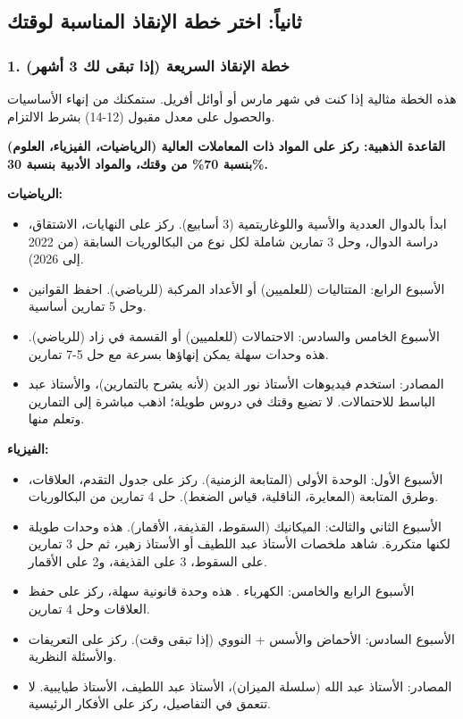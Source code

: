 \documentclass[12pt,a4paper]{book}
\newcommand{\importantAr}[1]{%
	\begin{important}
		\bfseries #1
	\end{important}
}
\begin{document}
	\subsection{ثانياً: اختر خطة الإنقاذ المناسبة لوقتك}
	
	\subsubsection*{1. خطة الإنقاذ السريعة (إذا تبقى لك 3 أشهر)}
	     \label{sec:psy-late-start-success3}
	هذه الخطة مثالية إذا كنت في شهر مارس أو أوائل أفريل. ستمكنك من إنهاء الأساسيات والحصول على معدل مقبول (12-14) بشرط الالتزام.
	
	\importantAr{القاعدة الذهبية: ركز على المواد ذات المعاملات العالية (الرياضيات، الفيزياء، العلوم) بنسبة 70\% من وقتك، والمواد الأدبية بنسبة 30\%.}
	
	\textbf{الرياضيات:}
	\begin{itemize}
		\item ابدأ بالدوال العددية والأسية واللوغاريتمية (3 أسابيع). ركز على النهايات، الاشتقاق، دراسة الدوال، وحل 3 تمارين شاملة لكل نوع من البكالوريات السابقة (من 2022 إلى 2026).
		\item الأسبوع الرابع: المتتاليات (للعلميين) أو الأعداد المركبة (للرياضي). احفظ القوانين وحل 5 تمارين أساسية.
		\item الأسبوع الخامس والسادس: الاحتمالات (للعلميين) أو القسمة في زاد (للرياضي). هذه وحدات سهلة يمكن إنهاؤها بسرعة مع حل 5-7 تمارين.
		\item المصادر: استخدم فيديوهات الأستاذ نور الدين (لأنه يشرح بالتمارين)، والأستاذ عبد الباسط للاحتمالات. لا تضيع وقتك في دروس طويلة؛ اذهب مباشرة إلى التمارين وتعلم منها.
	\end{itemize}
	
	\textbf{الفيزياء:}
	\begin{itemize}
		\item الأسبوع الأول: الوحدة الأولى (المتابعة الزمنية). ركز على جدول التقدم، العلاقات، وطرق المتابعة (المعايرة، الناقلية، قياس الضغط). حل 4 تمارين من البكالوريات.
		\item الأسبوع الثاني والثالث: الميكانيك (السقوط، القذيفة، الأقمار). هذه وحدات طويلة لكنها متكررة. شاهد ملخصات الأستاذ عبد اللطيف أو الأستاذ زهير، ثم حل 3 تمارين على السقوط، 3 على القذيفة، و2 على الأقمار.
		\item الأسبوع الرابع والخامس: الكهرباء . هذه وحدة قانونية سهلة، ركز على حفظ العلاقات وحل 4 تمارين.
		\item الأسبوع السادس: الأحماض والأسس + النووي (إذا تبقى وقت). ركز على التعريفات والأسئلة النظرية.
		\item المصادر: الأستاذ عبد الله (سلسلة الميزان)، الأستاذ عبد اللطيف، الأستاذ طيايبية. لا تتعمق في التفاصيل، ركز على الأفكار الرئيسية.
	\end{itemize}
	
\end{document}
